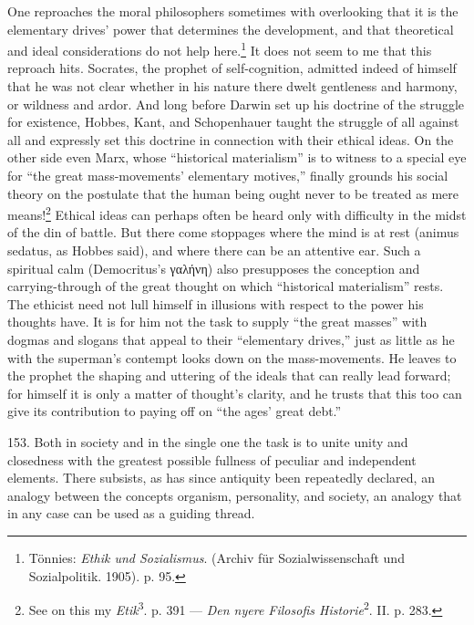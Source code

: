 \documentclass[12pt,a4paper]{book}
\newcommand{\opage}[1]{\marginnote{\footnotesize\textit{[#1]}}}
\begin{document}
One reproaches the moral philosophers sometimes with overlooking that it is the elementary drives' power that
determines the development, and that theoretical and ideal considerations do not help here.\footnote{Tönnies:
\emph{Ethik und Sozialismus}. (Archiv für Sozialwissenschaft und Sozialpolitik. 1905). p. 95.} It does not seem to
me that this reproach hits. Socrates, the prophet of self-cognition, admitted indeed of himself that he was not
clear whether in his nature there dwelt gentleness and harmony, or wildness and ardor. And long before Darwin set
up his doctrine of the struggle for existence, Hobbes, Kant, and Schopenhauer taught the struggle of all against
all and expressly set this doctrine in connection with their ethical ideas. On the other side even Marx, whose
``historical materialism'' is to witness to a special eye for ``the great mass-movements' elementary motives,''
finally grounds his social theory on the postulate that the human being ought never to be treated as mere
means!\footnote{See on this my \emph{Etik}\textsuperscript{3}. p. 391 --- \emph{Den nyere Filosofis
Historie}\textsuperscript{2}. II. p. 283.} Ethical ideas can perhaps often be heard only with difficulty in the
midst of the din of battle. But there come stoppages where the mind is at rest (animus sedatus, \opage{365}as Hobbes said),
and where there can be an attentive ear. Such a spiritual calm (Democritus's γαλήνη) also presupposes the conception
and carrying-through of the great thought on which ``historical materialism'' rests. The ethicist need not lull
himself in illusions with respect to the power his thoughts have. It is for him not the task to supply ``the great
masses'' with dogmas and slogans that appeal to their ``elementary drives,'' just as little as he with the
superman's contempt looks down on the mass-movements. He leaves to the prophet the shaping and uttering of the
ideals that can really lead forward; for himself it is only a matter of thought's clarity, and he trusts that this
too can give its contribution to paying off on ``the ages' great debt.''

153. Both in society and in the single one the task is to unite unity and closedness with the greatest possible
fullness of peculiar and independent elements. There subsists, as has since antiquity been repeatedly declared, an
analogy between the concepts organism, personality, and society, an analogy that in any case can be used as a
guiding thread.
\end{document}
